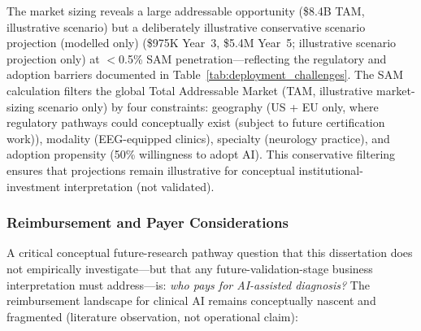 \noindent The market sizing reveals a large addressable opportunity (\$8.4B TAM, illustrative scenario) but a deliberately illustrative conservative scenario projection (modelled only) (\$975K Year~3, \$5.4M Year~5; illustrative scenario projection only) at $<$0.5\% SAM penetration---reflecting the regulatory and adoption barriers documented in Table~\ref{tab:deployment_challenges}. The SAM calculation filters the global Total Addressable Market (TAM, illustrative market-sizing scenario only) by four constraints: geography (US + EU only, where regulatory pathways could conceptually exist (subject to future certification work)), modality (EEG-equipped clinics), specialty (neurology practice), and adoption propensity (50\% willingness to adopt AI). This conservative filtering ensures that projections remain illustrative for conceptual institutional-investment interpretation (not validated).
\fi

\subsubsection{Reimbursement and Payer Considerations}

\iffalse
A critical conceptual future-research pathway question that this dissertation does not empirically investigate---but that any future-validation-stage business interpretation must address---is: \textit{who pays for AI-assisted diagnosis?} The reimbursement landscape for clinical AI remains conceptually nascent and fragmented (literature observation, not operational claim):

